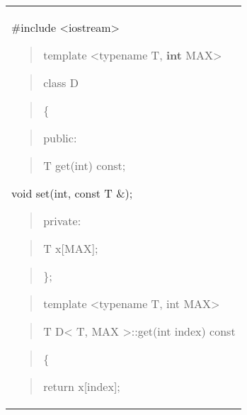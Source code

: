 \documentclass[
]{article}
\begin{document}
\begin{longtable}[]{@{}
  >{\raggedright\arraybackslash}p{}@{}}
\toprule\noalign{}
 \\
\midrule\noalign{}
\endhead
\bottomrule\noalign{}
\endlastfoot
\#include \textless iostream\textgreater{}

\begin{quote}
\end{quote}

\begin{quote}
template \textless typename T, \textbf{int} MAX\textgreater{}
\end{quote}

\begin{quote}
class D
\end{quote}

\begin{quote}
\{
\end{quote}

\begin{quote}
public:
\end{quote}

\begin{quote}
T get(int) const;
\end{quote}

void set(int, const T \&);

\begin{quote}
private:
\end{quote}

\begin{quote}
T x{[}MAX{]};
\end{quote}

\begin{quote}
\};
\end{quote}

\begin{quote}
\end{quote}

\begin{quote}
template \textless typename T, int MAX\textgreater{}
\end{quote}

\begin{quote}
T D\textless{} T, MAX \textgreater::get(int index) const
\end{quote}

\begin{quote}
\{
\end{quote}

\begin{quote}
return x{[}index{]};
\end{quote}


\end{longtable}
\end{document}
